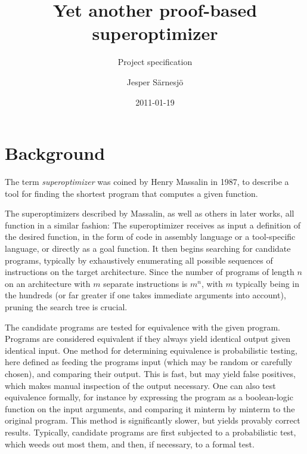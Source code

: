 \documentclass[a4paper,11pt]{kth-mag}
\title{Yet another proof-based superoptimizer}
\subtitle{Project specification}
\author{Jesper Särnesjö}
\date{2011-01-19}
\begin{document}
\frontmatter

\pagestyle{empty}

\removepagenumbers

\maketitle


\mainmatter

\pagestyle{newchap}

\section*{Background}

The term \emph{superoptimizer} was coined by Henry Massalin in 1987, to describe a tool for finding the shortest program that computes a given function.

The superoptimizers described by Massalin, as well as others in later works, all function in a similar fashion:
The superoptimizer receives as input a definition of the desired function, in the form of code in assembly language or a tool-specific language, or directly as a goal function.
It then begins searching for candidate programs, typically by exhaustively enumerating all possible sequences of instructions on the target architecture.
Since the number of programs of length $n$ on an architecture with $m$ separate instructions is $m^n$, with $m$ typically being in the hundreds (or far greater if one takes immediate arguments into account), pruning the search tree is crucial.

The candidate programs are tested for equivalence with the given program.
Programs are considered equivalent if they always yield identical output given identical input.
One method for determining equivalence is probabilistic testing, here defined as feeding the programs input (which may be random or carefully chosen), and comparing their output.
This is fast, but may yield false positives, which makes manual inspection of the output necessary.
One can also test equivalence formally, for instance by expressing the program as a boolean-logic function on the input arguments, and comparing it minterm by minterm to the original program.
This method is significantly slower, but yields provably correct results.
Typically, candidate programs are first subjected to a probabilistic test, which weeds out most them, and then, if necessary, to a formal test.
\end{document}
